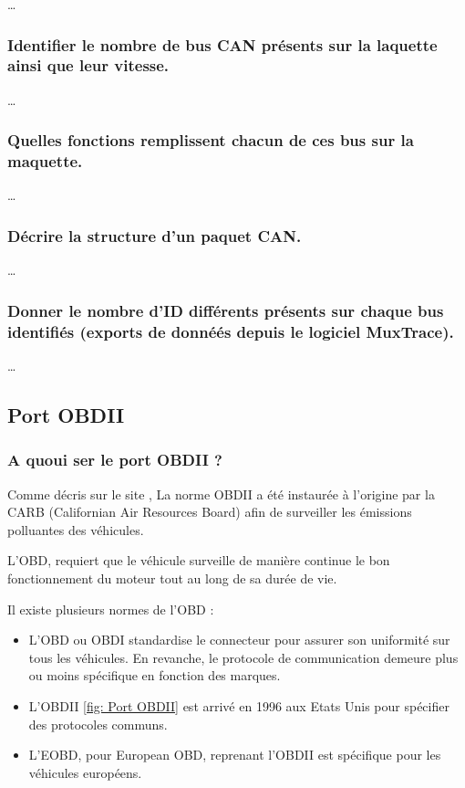 \documentclass{rapportECC}
\begin{document}
\dots

\subsubsection*{Identifier le nombre de bus CAN présents sur la laquette ainsi que leur vitesse.}

\dots

\subsubsection*{Quelles fonctions remplissent chacun de ces bus sur la maquette.}

\dots

\subsubsection*{Décrire la structure d'un paquet CAN.}

\dots

\subsubsection*{Donner le nombre d'ID différents présents sur chaque bus identifiés (exports de donnéés depuis le logiciel MuxTrace).}

\dots


\subsection{Port OBDII}

\subsubsection*{A quoui ser le port OBDII ?}

Comme décris sur le site \cite{klavkarr}, La norme OBDII a été instaurée à l'origine par la CARB (Californian Air Resources Board) afin de surveiller les émissions polluantes des véhicules.  

L'OBD, requiert que le véhicule surveille de manière continue le bon fonctionnement du moteur tout au long de sa durée de vie.

Il existe plusieurs normes de l'OBD : 
\begin{itemize}
    \item L'OBD ou OBDI standardise le connecteur pour assurer son uniformité sur tous les véhicules. En revanche, le protocole de communication demeure plus ou moins spécifique en fonction des marques.
    \item L'OBDII \ref{fig: Port OBDII} est arrivé en 1996 aux Etats Unis pour spécifier des protocoles communs.
    \item L'EOBD, pour European OBD, reprenant l'OBDII est spécifique pour les véhicules européens.
\end{itemize}
    
\end{document}
